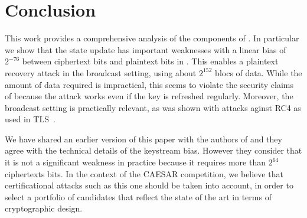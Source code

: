\section{Conclusion}
\label{sec/Conclusion}

This work provides a comprehensive analysis of the components of
\morus.  In particular we show that the state update has important
weaknesses with a linear bias of $2^{-76}$ between ciphertext bits and
plaintext bits in \morus[1280].  This enables a plaintext recovery
attack in the broadcast setting, using about $2^{152}$ blocs of data.
While the amount of data required is impractical, this seems to
violate the security claims of \morus[1280] because the attack works
even if the key is refreshed regularly.  Moreover, the broadcast
setting is practically relevant, as was shown with attacks aginst RC4
as used in TLS~\cite{DBLP:conf/uss/AlFardanBPPS13}.

We have shared an earlier version of this paper with the authors of
\morus and they agree with the technical details of the keystream
bias.  However they consider that it is not a significant weakness in
practice because it requires more than $2^{64}$ ciphertexts bits.  In
the context of the CAESAR competition, we believe that certificational
attacks such as this one should be taken into account, in order to
select a portfolio of candidates that reflect the state of the art in
terms of cryptographic design.


